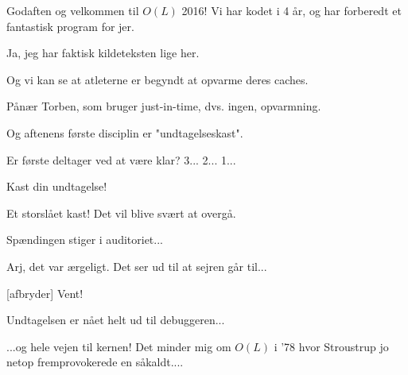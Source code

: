 \documentclass[a4paper,11pt]{article}
\begin{document}
\begin{sketch}


   Godaften og velkommen til $O(L)$ 2016! Vi har kodet i 4 år, og har
  forberedt et fantastisk program for jer.

   Ja, jeg har faktisk kildeteksten lige her.

   Og vi kan se at atleterne er begyndt at opvarme deres caches.

   Pånær Torben, som bruger just-in-time, dvs. ingen, opvarmning.

   Og aftenens første disciplin er "undtagelseskast".


   Er første deltager ved at være klar? 3... 2... 1...

   Kast din undtagelse!


   Et storslået kast!  Det vil blive svært at overgå.


   Spændingen stiger i auditoriet...


   Arj, det var ærgeligt.  Det ser ud til at sejren går til...

  [afbryder] Vent!


   Undtagelsen er nået helt ud til debuggeren...


   ...og hele vejen til kernen!  Det minder mig om $O(L)$ i
  '78 hvor Stroustrup jo netop fremprovokerede en såkaldt....



\end{sketch}
\end{document}
